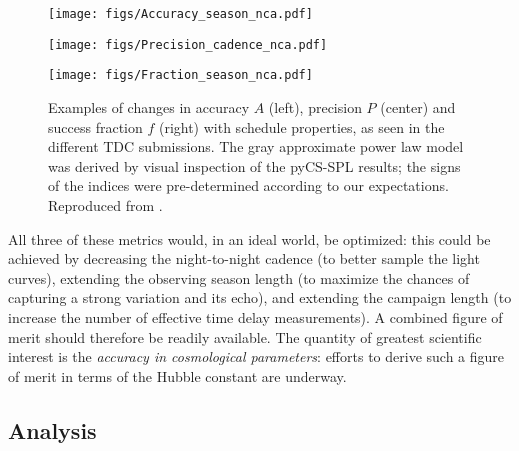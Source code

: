 \begin{figure*}[!ht]
  \capstart
  \begin{minipage}[b]{\linewidth}
    \begin{minipage}[b]{0.32\linewidth}
      \centering\texttt{[image: figs/Accuracy\_season\_nca.pdf]}
    \end{minipage} \hfill
    \begin{minipage}[b]{0.32\linewidth}
      \centering\texttt{[image: figs/Precision\_cadence\_nca.pdf]}
    \end{minipage} \hfill
    \begin{minipage}[b]{0.32\linewidth}
      \centering\texttt{[image: figs/Fraction\_season\_nca.pdf]}
    \end{minipage}
  \end{minipage}
\caption{Examples of changes in accuracy $A$ (left), precision $P$ (center) and success fraction $f$ (right) with schedule properties, as seen in the different TDC submissions. The gray
approximate power law model was derived by visual inspection of the
pyCS-SPL results; the signs of the indices were pre-determined according to our expectations. Reproduced from \citet{LiaoEtal2015}.}
\label{fig:tdcresults}
\end{figure*}

All three of these metrics would, in an ideal world, be optimized:
this could be achieved by decreasing the night-to-night cadence (to
better sample the light curves), extending the observing season length
(to maximize the chances of capturing a strong variation and its
echo), and extending the campaign length (to increase the number of
effective time delay measurements). A combined figure of merit should
therefore be readily available. The quantity of greatest scientific
interest is the {\it accuracy in cosmological parameters}: efforts to derive
such a figure of merit in terms of the Hubble constant are underway.


\subsection{\OpSim Analysis}
\label{sec:\secname:analysis}


